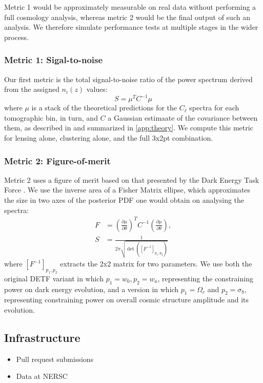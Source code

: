 \documentclass[twocolumn,twocolappendix]{aastex63}
\begin{document}
Metric 1 would be approximately measurable on real data without performing a full cosmology analysis,
whereas metric 2 would be the final output of such an analysis.  We therefore simulate performance
tests at multiple stages in the wider process.


\subsubsection{Metric 1: Sigal-to-noise}
Our first metric is the total signal-to-noise ratio of the power spectrum derived from the assigned
$n_i(z)$ values:
\begin{equation}
    S = \mu^{T} C^{-1} \mu
\end{equation}
where $\mu$ is a stack of the theoretical predictions for the $C_\ell$ spectra for each tomographic 
bin, in turn, and $C$ a Gaussian estimaate of the covariance between them, as described in
\citet{wl-review} and summarized in \autoref{app:theory}.   We compute this metric for lensing alone, clustering alone, and the full 3x2pt combination.

\subsubsection{Metric 2: Figure-of-merit}

Metric 2 uses a figure of merit based on that presented by the Dark Energy Task Force \citep{detf}.  We 
use the inverse area of a Fisher Matrix ellipse, which approximates the size in two axes 
of the posterior PDF one would obtain on analysing the spectra:
\begin{align}
    F &= \left( \frac{\partial \mu}{\partial \theta} \right)^T C^{-1} \left( \frac{\partial \mu}{\partial \theta} \right), \\
    S &= \frac{1}{2 \pi \sqrt{\det{([F^{-1}]_{p_1, p_2})}}}
\end{align}
where $[F^{-1}]_{p_1, p_2}$ extracts the 2x2 matrix for two parameters.  We use both the original
DETF variant in which $p_1 = w_0, p_2 = w_a$, representing the constraining power on dark energy 
evolution, and a version in which $p_1 = \Omega_c$ and $p_2 = \sigma_8$, representing constraining
power on overall cosmic structure amplitude and its evolution.




\subsection{Infrastructure}
\begin{itemize}
    \item Pull request submissions
    \item Data at NERSC
\end{itemize}
\end{document}
